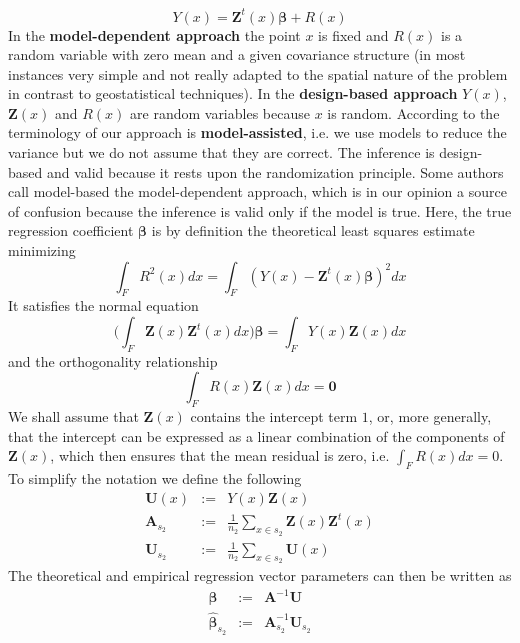 \documentclass[a4paper,12pt,leqno, titlepage]{article}
\begin{document}
   \begin{equation}\label{linearmodel1}
 Y(x)=\pmb{Z}^t(x)\pmb{\beta}+ R(x)
 \end{equation}
 In the \textbf{model-dependent approach} the point $x$ is fixed and $R(x)$ is a random variable with zero mean and a given covariance structure (in most instances very simple and not really adapted to the spatial nature of the problem in contrast to geostatistical techniques). In the \textbf{design-based approach} $Y(x)$, $\pmb{Z}(x)$ and $R(x)$ are random variables  because $x$ is random. According to the terminology of \cite{sarndal} our approach is \textbf{model-assisted}, i.e. we use models to reduce the variance but we do not assume that they are correct. The inference is design-based and valid because it rests upon the randomization principle. Some authors call model-based the model-dependent approach, which is in our opinion a source of confusion because the inference is valid only if the model is true. Here, the true regression coefficient $\pmb{\beta}$ is by definition the theoretical least squares estimate minimizing
 $$\int_F R^2(x)dx=\int_F(Y(x)-\pmb{Z}^t(x)\pmb{\beta})^2 dx$$
 It satisfies the normal equation
 \begin{equation}\label{normaleq1}
 \Big(\int_F\pmb{Z}(x)\pmb{Z}^t(x)dx\Big)\pmb{\beta}=\int_F Y(x)\pmb{Z}(x)dx
 \end{equation}
 and the orthogonality relationship
 \begin{equation}\label{linearmodel2}
 \int_F R(x)\pmb{Z}(x)dx=\pmb{0}
 \end{equation}
  We shall assume that $\pmb{Z}(x)$ contains the intercept term $1$, or, more generally, that the intercept can be expressed as a linear combination of the components of $\pmb{Z}(x)$, which then ensures that the mean residual is zero, i.e. $\int_F R(x)dx=0$. To simplify the notation we define the following
  \begin{eqnarray}
  \pmb{U}(x)&:=&Y(x)\pmb{Z}(x) \nonumber \\
  \pmb{A}_{s_2}&:=&\frac{1}{n_2}\sum_{x\in{s_2}}\pmb{Z}(x)\pmb{Z}^t(x)\nonumber \\
  \pmb{U}_{s_2}&:=&\frac{1}{n_2}\sum_{x\in{s_2}}\pmb{U}(x)
  \end{eqnarray}
 The theoretical and empirical regression vector parameters can then be written as
 \begin{eqnarray}\label{linearmodel3}
 \pmb{\beta}&:=&\pmb{A}^{-1}\pmb{U} \nonumber \\
 \hat{\pmb{\beta}}_{s_2}&:=&\pmb{A}_{s_2}^{-1}\pmb{U}_{s_2}
 \end{eqnarray}
\end{document}
